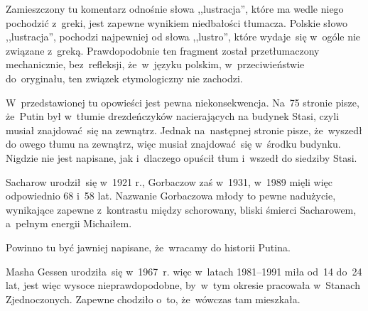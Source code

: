 \documentclass[a4paper,11pt]{article}
\begin{document}
\vspace{\spaceTwo}








\start {} Zamieszczony tu komentarz odnośnie słowa
,,lustracja'', które ma wedle niego pochodzić z~greki, jest zapewne
wynikiem niedbałości tłumacza. Polskie słowo ,,lustracja'', pochodzi
najpewniej od słowa ,,lustro'', które wydaje~się w~ogóle nie związane
z~greką. Prawdopodobnie ten fragment został przetłumaczony
mechanicznie, bez~refleksji, że~w~języku polskim, w~przeciwieństwie
do~oryginału, ten związek etymologiczny nie zachodzi.

\vspace{\spaceFour}


\start {} W~przedstawionej tu opowieści jest pewna
niekonsekwencja. Na~75 stronie pisze, że~Putin był w~tłumie
drezdeńczyków nacierających na budynek Stasi, czyli musiał
znajdować~się na zewnątrz. Jednak na~następnej stronie pisze,
że~wyszedł do owego tłumu na zewnątrz, więc musiał znajdować~się
w~środku budynku. Nigdzie nie jest napisane, jak i~dlaczego opuścił
tłum i~wszedł do siedziby Stasi.

\vspace{\spaceFour}


\start {} Sacharow urodził~się w~1921 r., Gorbaczow zaś w~1931,
w~1989 mięli więc odpowiednio 68 i~58 lat. Nazwanie Gorbaczowa młody
to pewne nadużycie, wynikające zapewne z~kontrastu między schorowany,
bliski śmierci Sacharowem, a~pełnym energii Michaiłem.

\vspace{\spaceFour}


\start {}  Powinno tu być jawniej napisane,
że~wracamy do historii Putina.

\vspace{\spaceFour}


\start {} Masha Gessen
urodziła~się w~1967~r. więc w~latach 1981--1991 miła od~14 do~24 lat,
jest więc wysoce nieprawdopodobne, by~w~tym okresie pracowała
w~Stanach Zjednoczonych. Zapewne chodziło o~to, że~wówczas tam
mieszkała.
\end{document}
